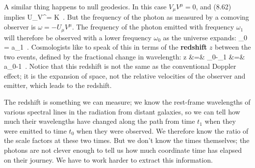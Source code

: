 A similar thing happens to null geodesics.  In this case 
$V_\mu V^\mu =0$, and (8.62) implies 
\be
  U_\mu V^\mu = {{K}}\ .\label{8.65}
\ee
But the frequency of the photon as measured by a comoving
observer is $\omega=-U_\mu V^\mu$.  The frequency of the photon
emitted with frequency $\omega_1$ will therefore be observed with
a lower frequency $\omega_0$ as the universe expands:
\be
  {{\omega_0}} = {{a_1}}\ .\label{8.66}
\ee
Cosmologists like to speak of this in terms of the {\bf redshift}
$z$ between the two events, defined by the fractional change in
wavelength:
\bea
  z &=&  {{\lambda_0-\lambda_1}}\cr
  &=& {{a_0}}-1\ .\label{8.67}
\eea
Notice that this redshift is not the same as the conventional
Doppler effect; it is the expansion of space, not the relative
velocities of the observer and emitter, which leads to the
redshift.

The redshift is something we can measure; we know the rest-frame
wavelengths of various spectral lines in the radiation from
distant galaxies, so we can tell how much their wavelengths have
changed along the path from time $t_1$ when they were emitted to
time $t_0$ when they were observed.  We therefore know the
ratio of the scale factors at these two times.  But we don't know
the times themselves; the photons are not clever enough to tell
us how much coordinate time has elapsed on their journey.  We have
to work harder to extract this information.

